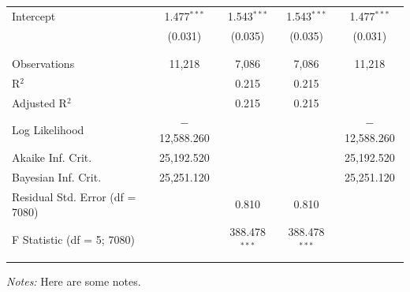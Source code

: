\begin{table}[!htbp]
\begin{tabular}{@{\extracolsep{5pt}}lcccc}
 Intercept & 1.477$^{***}$ & 1.543$^{***}$ & 1.543$^{***}$ & 1.477$^{***}$ \\ 
  & (0.031) & (0.035) & (0.035) & (0.031) \\ 
  & & & & \\ 
\hline \\[-1.8ex] 
Observations & 11,218 & 7,086 & 7,086 & 11,218 \\ 
R$^{2}$ &  & 0.215 & 0.215 &  \\ 
Adjusted R$^{2}$ &  & 0.215 & 0.215 &  \\ 
Log Likelihood & $-$12,588.260 &  &  & $-$12,588.260 \\ 
Akaike Inf. Crit. & 25,192.520 &  &  & 25,192.520 \\ 
Bayesian Inf. Crit. & 25,251.120 &  &  & 25,251.120 \\ 
Residual Std. Error (df = 7080) &  & 0.810 & 0.810 &  \\ 
F Statistic (df = 5; 7080) &  & 388.478$^{***}$ & 388.478$^{***}$ &  \\ 
\hline 
\hline \\[-1.8ex] 
\end{tabular}
\emph{Notes:} Here are some notes.
\end{table}
